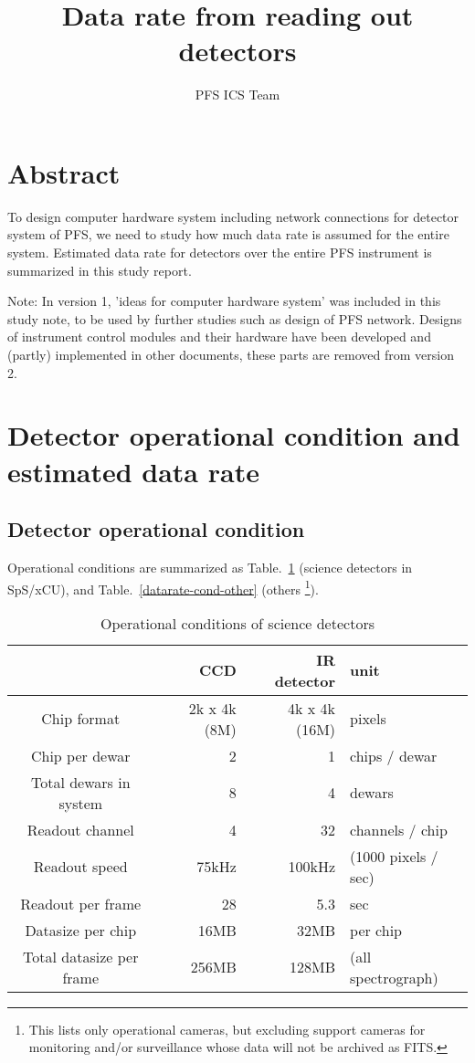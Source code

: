 \documentclass[a4paper,notitlepage]{article}
\title{Data rate from reading out detectors}
\author{PFS ICS Team}
\begin{document}

\ssnhead

\section{Abstract}

To design computer hardware system including network connections for detector 
system of PFS, we need to study how much data rate is assumed for the entire 
system. 
Estimated data rate for detectors over the entire PFS instrument is 
summarized in this study report. 

Note: In version 1, 'ideas for computer hardware system' was included in this 
study note, to be used by further studies such as design of PFS network. 
Designs of instrument control modules and their hardware have been developed 
and (partly) implemented in other documents, these parts are removed from 
version 2.

\section{Detector operational condition and estimated data rate}

\subsection{Detector operational condition}

Operational conditions are summarized as Table.~\ref{datarate-cond} (science 
detectors in SpS/xCU), and Table.~\ref{datarate-cond-other} (others
\footnote{This lists only operational cameras, but excluding support cameras 
for monitoring and/or surveillance whose data will not be archived as FITS.}).

\begin{table}[htb]
\caption{Operational conditions of science detectors}
\label{datarate-cond}
\begin{center}
\begin{tabular}{c||r|r|l}
   & CCD & IR detector & unit \\
  \hline
  Chip format & 2k x 4k (8M) & 4k x 4k (16M) & pixels \\
  Chip per dewar & 2 & 1 & chips / dewar \\
  Total dewars in system & 8 & 4 & dewars \\
  Readout channel & 4 & 32 & channels / chip \\
  Readout speed & 75kHz & 100kHz & (1000 pixels / sec) \\
  Readout per frame & 28 & 5.3 & sec \\
  \hline
  Datasize per chip & 16MB & 32MB & per chip \\
  Total datasize per frame & 256MB & 128MB & (all spectrograph) \\
\end{tabular}
\end{center}
\end{table}
\end{document}

